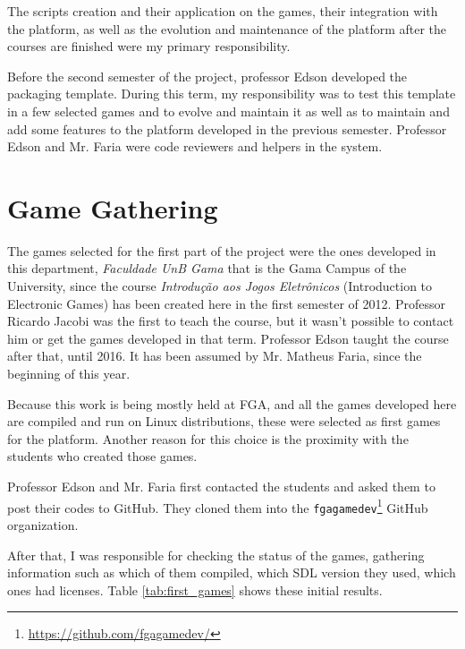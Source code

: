 The scripts creation and their application on the games, their integration with the platform, as well as the evolution and maintenance of the platform after the courses are finished were my primary responsibility.

Before the second semester of the project, professor Edson developed the packaging template. During this term, my responsibility was to test this template in a few selected games and to evolve and maintain it as well as to maintain and add some features to the platform developed in the previous semester. Professor Edson and Mr. Faria were code reviewers and helpers in the system.


\section{Game Gathering}
\label{sec:game_gathering}

The games selected for the first part of the project were the ones developed in this department, \textit{Faculdade UnB Gama} that is the Gama Campus of the University, since the course \textit{Introdu\c{c}\~ao aos Jogos Eletr\^onicos} (Introduction to Electronic Games) has been created here in the first semester of 2012. Professor Ricardo Jacobi was the first to teach the course, but it wasn't possible to contact him or get the games developed in that term. Professor Edson taught the course after that, until 2016. It has been assumed by Mr. Matheus Faria, since the beginning of this year.

Because this work is being mostly held at FGA, and all the games developed here are compiled and run on Linux distributions, these were selected as first games for the platform. Another reason for this choice is the proximity with the students who created those games.

Professor Edson and Mr. Faria first contacted the students and asked them to post their codes to GitHub. They cloned them into the \texttt{fgagamedev}\footnote{ \href{https://github.com/fgagamedev}{https://github.com/fgagamedev/} } GitHub organization.

After that, I was responsible for checking the status of the games, gathering information such as which of them compiled, which SDL version they used, which ones had licenses. Table \ref{tab:first_games} shows these initial results.


